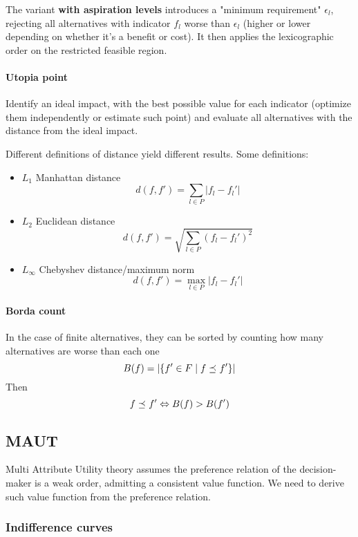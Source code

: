 The variant \textbf{with aspiration levels} introduces a "minimum requirement" $\epsilon_l$, rejecting all alternatives with indicator $f_l$ worse than $\epsilon_l$ (higher or lower depending on whether it's a benefit or cost). It then applies the lexicographic order on the restricted feasible region.

\paragraph{Utopia point} Identify an ideal impact, with the best possible value for each indicator (optimize them independently or estimate such point) and evaluate all alternatives with the distance from the ideal impact. 

Different definitions of distance yield different results. Some definitions:
\begin{itemize}
	\item $L_1$ Manhattan distance
	$$ d(f, f') = \sum_{l \in P} |f_l - f_l'|$$
	
	\item $L_2$ Euclidean distance
	$$ d(f, f') = \sqrt{\sum_{l \in P} \left(f_l - f_l'\right)^2} $$
	
	\item $L_\infty$ Chebyshev distance/maximum norm
	$$ d(f,f') = \max_{l \in P} |f_l - f_l'| $$
\end{itemize}

\paragraph{Borda count} In the case of finite alternatives, they can be sorted by counting how many alternatives are worse than each one
$$ B(f) = \left|\left\{f' \in F \mid f \preceq_{} f' \right\}\right| $$
Then 
$$ f \preceq_{} f' \Leftrightarrow B(f) > B(f') $$ 

\subsection{MAUT}

Multi Attribute Utility theory assumes the preference relation of the decision-maker is a weak order, admitting a consistent value function. We need to derive such value function from the preference relation.

\subsubsection{Indifference curves}

